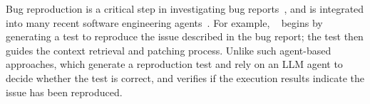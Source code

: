 Bug reproduction is a critical step in investigating bug reports~\cite{jin2012bugredux}, and is integrated into many recent software engineering agents~\cite{opendevin,specrover,honeycomb,mentatbot,factorydroid,sweagent,masai}.
For example, \specrover~\cite{specrover} begins by generating a test to reproduce the issue described in the bug report; the test then guides the context retrieval and patching process.%
Unlike such agent-based approaches, which generate a reproduction test and rely on an LLM agent to decide whether the test is correct,  and verifies if the execution results indicate the issue has been reproduced.













